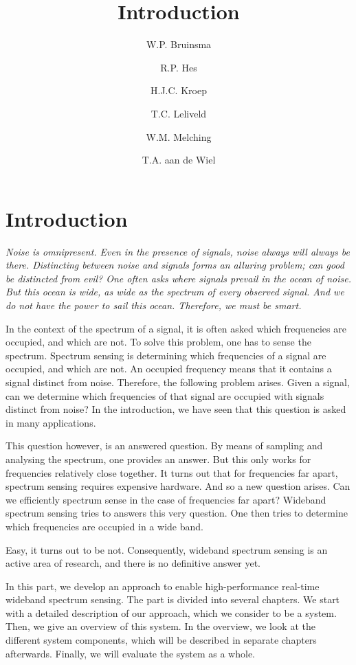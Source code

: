 \documentclass[a4paper, openany, oneside]{memoir}
\title{Introduction}
\author{W.P. Bruinsma \and R.P. Hes \and H.J.C. Kroep \and T.C. Leliveld \and W.M. Melching \and T.A. aan de Wiel}
\begin{document}
\chapter{Introduction}
\textit{Noise is omnipresent. Even in the presence of signals, noise always will always be there. Distincting between noise and signals forms an alluring problem; can good be distincted from evil? One often asks where signals prevail in the ocean of noise. But this ocean is wide, as wide as the spectrum of every observed signal. And we do not have the power to sail this ocean. Therefore, we must be smart.}

In the context of the spectrum of a signal, it is often asked which frequencies are occupied, and which are not. To solve this problem, one has to sense the spectrum. Spectrum sensing is determining which frequencies of a signal are occupied, and which are not. An occupied frequency means that it contains a signal distinct from noise. Therefore, the following problem arises. Given a signal, can we determine which frequencies of that signal are occupied with signals distinct from noise? In the introduction, we have seen that this question is asked in many applications.

This question however, is an answered question. By means of sampling and analysing the spectrum, one provides an answer. But this only works for frequencies relatively close together. It turns out that for frequencies far apart, spectrum sensing requires expensive hardware. And so a new question arises. Can we efficiently spectrum sense in the case of frequencies far apart? Wideband spectrum sensing tries to answers this very question. One then tries to determine which frequencies are occupied in a wide band.

Easy, it turns out to be not. Consequently, wideband spectrum sensing is an active area of research, and there is no definitive answer yet.

In this part, we develop an approach to enable high-performance real-time wideband spectrum sensing. The part is divided into several chapters. We start with a detailed description of our approach, which we consider to be a system. Then, we give an overview of this system. In the overview, we look at the different system components, which will be described in separate chapters afterwards. Finally, we will evaluate the system as a whole.
\end{document}
